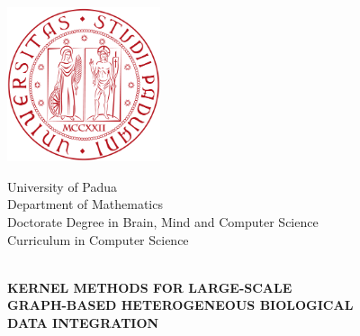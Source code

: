 \begin{titlepage}
	\begin{center}
	
		\includegraphics[width=4.5cm]{img/logoUnipd.png}

		
		\vspace{.5cm}
		\textrm{\LARGE University of Padua}
		\\[.1cm]
		\textrm{\Large Department of Mathematics\xspace}
		\\[.1cm]
		\textrm{\normalsize Doctorate Degree in Brain, Mind and Computer Science}
		\\[.1cm]
		\textrm{Curriculum in Computer Science}\\
		
		\vspace{.5cm}

		
		\vspace{1cm}
		
		\HRule \\
		\vspace{.5cm}
		\scshape{\large \textbf{ KERNEL METHODS FOR LARGE-SCALE} \\[0.25cm]
		\textbf{ GRAPH-BASED HETEROGENEOUS BIOLOGICAL} \\[0.25cm] \textbf{ DATA INTEGRATION}}\\
		\vspace{.4cm}
		
		\HRule\\
		\vspace{3cm}
		

\end{center}
\end{titlepage}
